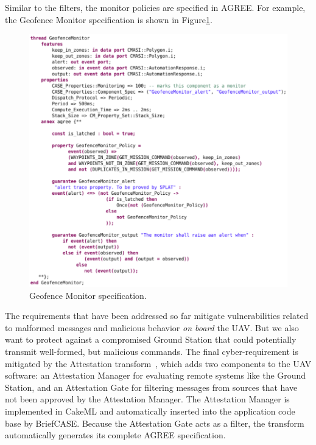 Similar to the filters, the monitor policies are specified in AGREE. For example, 
the Geofence Monitor specification is shown in Figure\ref{fig:geofence-monitor}. 


\begin{figure}[h]
	\centering
	\includegraphics[width=1\columnwidth]{figs/geofence-monitor.png}
	\caption{Geofence Monitor specification.} 
	\label{fig:geofence-monitor} 
\end{figure}

The requirements that have been addressed so far mitigate vulnerabilities related to malformed messages and malicious behavior \textit{on board} the UAV.  But we also want to protect against a compromised Ground Station that could potentially transmit well-formed, but malicious commands. The final cyber-requirement is mitigated by the Attestation transform~\cite{attestation-copland}, which adds two components to the UAV software: an Attestation Manager for evaluating remote systems like the Ground Station, and an Attestation Gate for filtering messages from sources that have not been approved by the Attestation Manager.  The Attestation Manager is implemented in CakeML and automatically inserted into the application code base by BriefCASE.  Because the Attestation Gate acts as a filter, the transform automatically generates its complete AGREE specification.%

